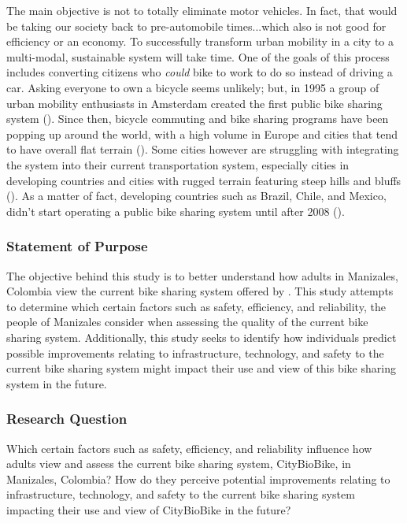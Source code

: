 \documentclass[12pt]{article}
\begin{document}
The main objective is not to totally eliminate motor vehicles. In fact, that would be taking our society back to pre-automobile times...which also is not good for efficiency or an economy. To successfully transform urban mobility in a city to a multi-modal, sustainable system will take time. One of the goals of this process includes converting citizens who \textit{could} bike to work to do so instead of driving a car. Asking everyone to own a bicycle seems unlikely; but, in 1995 a group of urban mobility enthusiasts in Amsterdam created the first public bike sharing system (\cite{zuluaga_garcía_2017}). Since then, bicycle commuting and bike sharing programs have been popping up around the world, with a high volume in Europe and cities that tend to have overall flat terrain (\cite{DeliotteReport}). Some cities however are struggling with integrating the system into their current transportation system, especially cities in developing countries and cities with rugged terrain featuring steep hills and bluffs (\cite{zuluaga_garcía_2017}). As a matter of fact, developing countries such as Brazil, Chile, and Mexico, didn't start operating a public bike sharing system until after 2008 (\cite{midgley_2011}).
\medskip
\subsubsection*{Statement of Purpose}
The objective behind this study is to better understand how adults in Manizales, Colombia view the current bike sharing system offered by .
This study attempts to determine which certain factors such as safety, efficiency, and reliability,
the people of Manizales consider when assessing the quality of the current bike sharing system. Additionally, this study seeks to identify how individuals predict
possible improvements relating to infrastructure, technology, and safety to the current bike sharing system might 
impact their use and view of this bike sharing system in the future.
\subsubsection*{Research Question}
Which certain factors such as safety, efficiency, and reliability influence how 
adults view and assess the current bike sharing system, CityBioBike, in Manizales, Colombia? 
How do they perceive potential improvements relating to infrastructure, technology, and safety
to the current bike sharing system impacting their use and view of CityBioBike in the future?
\end{document}
